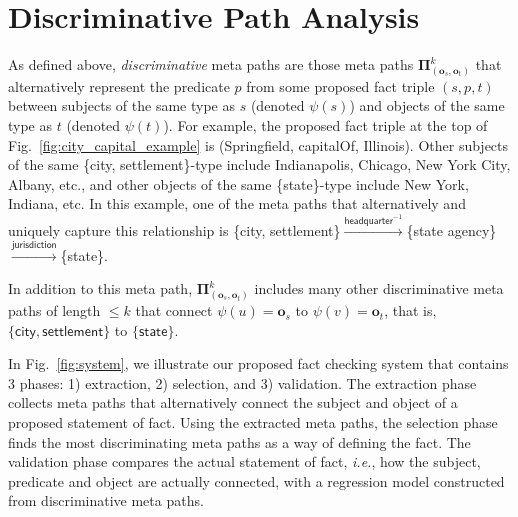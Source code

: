 \documentclass[reprint,twocolumn,showpacs,preprintnumbers,amsmath, aps,pre,amssymb]{revtex4-1}
\newcommand\ie{\emph{i.e.}}
\begin{document}
\section{Discriminative Path Analysis} \label{sec:discriminative_path_discovery}

As defined above, \emph{discriminative} meta paths are those meta paths $\mathbf{\Pi}^{k}_{(\mathbf{o}_s,\mathbf{o}_t)}$ that alternatively represent the predicate $p$ from some proposed fact triple $(s, p, t)$ between subjects of the same type as $s$ (denoted $\psi({s})$) and objects of the same type as $t$ (denoted $\psi({t})$). For example, the proposed fact triple at the top of Fig.~\ref{fig:city_capital_example} is (\textsf{Springfield}, \textsf{capitalOf}, \textsf{Illinois}). Other subjects of the same \textsf{\{city, settlement\}}-type include \textsf{Indianapolis}, \textsf{Chicago}, \textsf{New York City}, \textsf{Albany}, etc., and other objects of the same \textsf{\{state\}}-type include \textsf{New York}, \textsf{Indiana}, etc. In this example, one of the meta paths that alternatively and uniquely capture this relationship is \textsf{\{city, settlement\}}$\xrightarrow{\textsf{headquarter}^{-1}}$\{\textsf{state agency}\}$\xrightarrow{\textsf{jurisdiction}}$\{\textsf{state}\}.


In addition to this meta path, $\mathbf{\Pi}^{k}_{(\textbf{o}_s,\textbf{o}_t)}$ includes many other discriminative meta paths of length $\le k$ that connect $\psi(u)=\textbf{o}_s$ to $\psi(v)=\textbf{o}_t$, that is, $\{\textsf{city}, \textsf{settlement}\}$ to $\{\textsf{state}\}$.

In Fig.~\ref{fig:system}, we illustrate our proposed fact checking system that contains 3 phases: 1) extraction, 2) selection, and 3) validation. The extraction phase collects meta paths that alternatively connect the subject and object of a proposed statement of fact. Using the extracted meta paths, the selection phase finds the most discriminating meta paths as a way of defining the fact. The validation phase compares the actual statement of fact, \ie, how the subject, predicate and object are actually connected, with a regression model constructed from discriminative meta paths. 




\end{document}
